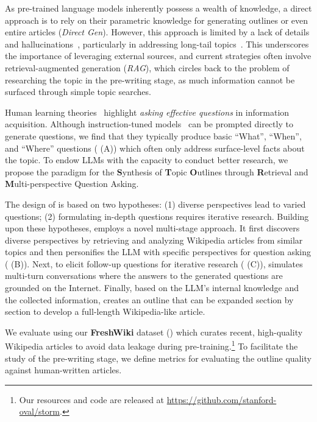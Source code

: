 As pre-trained language models inherently possess a wealth of knowledge, a direct approach is to rely on their parametric knowledge for generating outlines or even entire articles (\textit{Direct Gen}). However, this approach is limited by a lack of details and hallucinations~\citep{xu-etal-2023-critical}, particularly in addressing long-tail topics~\cite{kandpal2023large}. This underscores the importance of leveraging external sources, and current strategies often involve retrieval-augmented generation (\textit{RAG}), which circles back to the problem of researching the topic in the pre-writing stage, as much information cannot be surfaced through simple topic searches.


Human learning theories~\citep{tawfik2020role,booth2003craft}  highlight \textit{asking effective questions} in information acquisition.  
Although instruction-tuned models~\citep{ouyang2022training} can be prompted directly to generate questions, we find that they typically produce basic ``What'', ``When'', and ``Where'' questions ( (A)) which often only address surface-level facts about the topic. 
To endow LLMs with the capacity to conduct better research, we propose the \textbf{\system} paradigm for the \textbf{S}ynthesis of \textbf{T}opic \textbf{O}utlines through \textbf{R}etrieval and \textbf{M}ulti-perspective Question Asking.

The design of \system is based on two hypotheses: (1) diverse perspectives lead to varied questions; (2) formulating in-depth questions requires iterative research. Building upon these hypotheses, \system employs 
a novel multi-stage approach. It first discovers diverse perspectives by retrieving and analyzing Wikipedia articles from similar topics and then personifies the LLM with specific perspectives for question asking ( (B)). Next, to elicit follow-up questions for iterative research ( (C)), %
\system simulates multi-turn conversations where the answers to the generated questions are grounded on the Internet. Finally, based on the LLM's internal knowledge and the collected information, \system creates an outline that can be expanded section by section to develop a full-length Wikipedia-like article.











We evaluate \system using our \textbf{FreshWiki} dataset () which curates recent, high-quality Wikipedia articles to avoid data leakage during pre-training.\footnote{Our resources and code are released at \url{https://github.com/stanford-oval/storm}.}
To facilitate the study of the pre-writing stage, we define metrics for evaluating the outline quality against human-written articles. 

